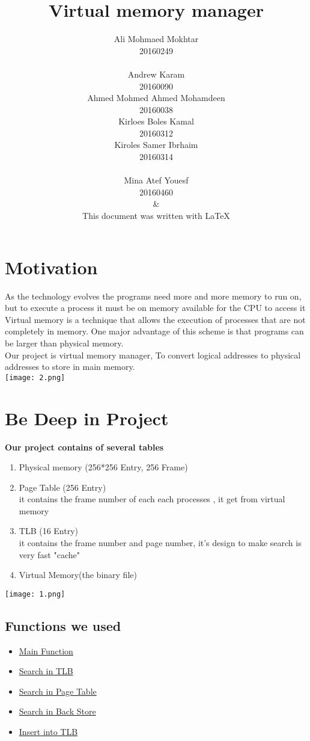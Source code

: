 \documentclass[landscape,17pt]{extarticle}
\title{\textbf{Virtual memory manager}}
\author{Ali Mohmaed Mokhtar\\20160249\\\\Andrew Karam \\20160090\\Ahmed Mohmed Ahmed Mohamdeen\\20160038\\Kirloes Boles Kamal\\ 20160312\\Kiroles Samer Ibrhaim  \\20160314\\\\Mina Atef Youesf\\20160460\\\&\\{\small This document was written with \LaTeX}} %
\begin{document}
\maketitle
\newpage
{}

\tableofcontents
\newpage
\section{Motivation}
As the technology evolves the programs need more and more memory to run on, but to execute a process it must be on memory available for the CPU to access it Virtual memory is a technique that allows the execution of processes that are not completely in memory. One major advantage of this scheme is
that programs can be larger than physical memory.\\
Our project is virtual memory manager, To convert logical addresses to physical addresses to store in main memory.\\
\texttt{[image: 2.png]}
\section{Be Deep in Project}
\textbf{Our project contains of several tables}
\\
\begin{enumerate}
    \item Physical memory (256*256 Entry, 256 Frame)
    \item Page Table (256 Entry)\\
        it contains the frame number of each each processes , it get from virtual memory
    \item TLB (16 Entry)\\
        it contains the frame number and page number, it's design to make search is very fast "cache"
    \item Virtual Memory(the binary file)
\end{enumerate}
\texttt{[image: 1.png]}\\
\subsection{Functions we used}
\begin{itemize}
  \item \hyperlink{main}{Main Function}
  \item \hyperlink{tlb}{Search in TLB}
  \item \hyperlink{pt}{Search in Page Table}
  \item \hyperlink{bs}{Search in Back Store}
  \item \hyperlink{itlb}{Insert into TLB}
\end{itemize}
\end{document}
